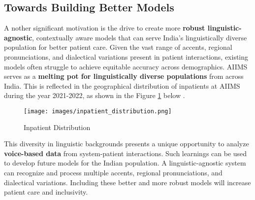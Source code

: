 \subsection{Towards Building Better Models}
\lettrine{A}{ }nother significant motivation is the drive to create more \textcolor{TUMRed}{\textbf{robust linguistic-agnostic}}, contextually aware models that can serve India's linguistically diverse population for better patient care. Given the vast range of accents, regional pronunciations, and dialectical variations present in patient interactions, existing models often struggle to achieve equitable accuracy across demographics. AIIMS serves as a \textcolor{TUMRed}{\textbf{melting pot for linguistically diverse populations}} from across India. This is reflected in the geographical distribution of inpatients at AIIMS during the year 2021-2022, as shown in the Figure \ref{fig:inpatient_distribution} below \cite{AIIMS2024}.\\[\baselineskip]

\begin{figure}[H]
    \centering
    \texttt{[image: images/inpatient\_distribution.png]}
    \caption{Inpatient Distribution}
    \label{fig:inpatient_distribution}
\end{figure}

\noindent This diversity in linguistic backgrounds presents a unique opportunity to analyze \textcolor{TUMRed}{\textbf{voice-based data}} from system-patient interactions. Such learnings can be used to develop future models for the Indian population. A linguistic-agnostic system can recognize and process multiple accents, regional pronunciations, and dialectical variations. Including these better and more robust models will increase patient care and inclusivity.


